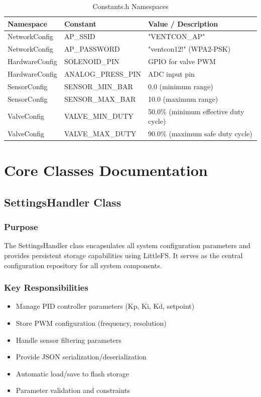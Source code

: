 \documentclass[12pt,a4paper]{article}
\begin{document}
\begin{table}[H]
\centering
\caption{Constants.h Namespaces}
\label{tab:constants}
\begin{tabular}{|l|l|p{6cm}|}
\hline
\textbf{Namespace} & \textbf{Constant} & \textbf{Value / Description} \\
\hline
NetworkConfig & AP\_SSID & "VENTCON\_AP" \\
NetworkConfig & AP\_PASSWORD & "ventcon12!" (WPA2-PSK) \\
HardwareConfig & SOLENOID\_PIN & GPIO for valve PWM \\
HardwareConfig & ANALOG\_PRESS\_PIN & ADC input pin \\
SensorConfig & SENSOR\_MIN\_BAR & 0.0 (minimum range) \\
SensorConfig & SENSOR\_MAX\_BAR & 10.0 (maximum range) \\
ValveConfig & VALVE\_MIN\_DUTY & 50.0\% (minimum effective duty cycle) \\
ValveConfig & VALVE\_MAX\_DUTY & 90.0\% (maximum safe duty cycle) \\
\hline
\end{tabular}
\end{table}

\section{Core Classes Documentation}

\subsection{SettingsHandler Class}

\subsubsection{Purpose}
The SettingsHandler class encapsulates all system configuration parameters and provides persistent storage capabilities using LittleFS. It serves as the central configuration repository for all system components.

\subsubsection{Key Responsibilities}
\begin{itemize}
    \item Manage PID controller parameters (Kp, Ki, Kd, setpoint)
    \item Store PWM configuration (frequency, resolution)
    \item Handle sensor filtering parameters
    \item Provide JSON serialization/deserialization
    \item Automatic load/save to flash storage
    \item Parameter validation and constraints
\end{itemize}
\end{document}
